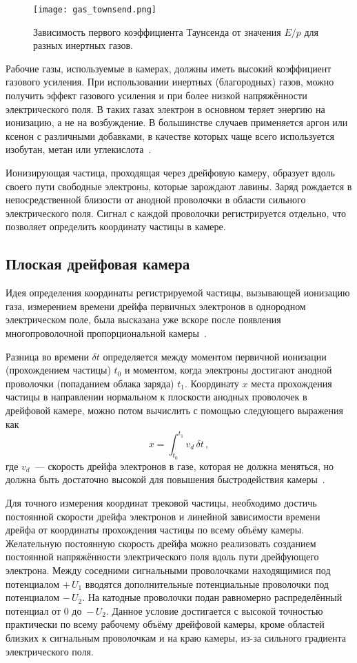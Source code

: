 \begin{figure}[h]
  \centering
  \texttt{[image: gas\_townsend.png]}
  \caption{Зависимость первого коэффициента Таунсенда от значения $E/p$ для
    разных инертных газов.}
  \label{fig:gas_townsend}
\end{figure}

Рабочие газы, используемые в камерах, должны иметь высокий коэффициент газового
усиления. При использовании инертных (благородных) газов, можно получить эффект
газового усиления и при более низкой напряжённости электрического поля. В таких
газах электрон в основном теряет энергию на ионизацию, а не на возбуждение.
В большинстве случаев применяется аргон или ксенон с различными добавками, в
качестве которых чаще всего используется изобутан, метан или
углекислота~\cite{zanevski78}.

Ионизирующая частица, проходящая через дрейфовую камеру, образует вдоль своего
пути свободные электроны, которые зарождают лавины. Заряд рождается в
непосредственной близости от анодной проволочки в области сильного
электрического поля. Сигнал с каждой проволочки регистрируется отдельно, что
позволяет определить координату частицы в камере.

\subsection{Плоская дрейфовая камера}
Идея определения координаты регистрируемой частицы, вызывающей ионизацию газа,
измерением времени дрейфа первичных электронов в однородном электрическом поле,
была высказана уже вскоре после появления многопроволочной пропорциональной
камеры~\cite{charp70}.

Разница во времени $\delta t$ определяется между моментом первичной ионизации
(прохождением частицы) $t_0$ и моментом, когда электроны достигают анодной
проволочки (попаданием облака заряда) $t_1$. Координату $x$ места прохождения
частицы в направлении нормальном к плоскости анодных проволочек в дрейфовой
камере, можно потом вычислить с помощью следующего выражения как
\begin{equation}
  x=\int_{t_0}^{t_1} v_d\,\delta t\,,
\end{equation}
где $v_{d}$~--- скорость дрейфа электронов в газе, которая не должна меняться,
но должна быть достаточно высокой для повышения быстродействия
камеры~\cite{sauli77}.

Для точного измерения координат трековой частицы, необходимо достичь постоянной
скорости дрейфа электронов и линейной зависимости времени дрейфа от координаты
прохождения частицы по всему объёму камеры. Желательную постоянную скорость
дрейфа  можно реализовать созданием постоянной напряжённости электрического поля
вдоль пути дрейфующего электрона. Между соседними сигнальными проволочками
находящимися под потенциалом $+\,U_1$ вводятся дополнительные потенциальные
проволочки под потенциалом $-\,U_2$. На катодные проволочки подан равномерно
распределённый потенциал от 0 до~$-\,U_2$. Данное условие достигается с высокой
точностью практически по всему рабочему объёму дрейфовой камеры, кроме областей
близких к сигнальным проволочкам и на краю камеры, из-за сильного градиента
электрического поля.


